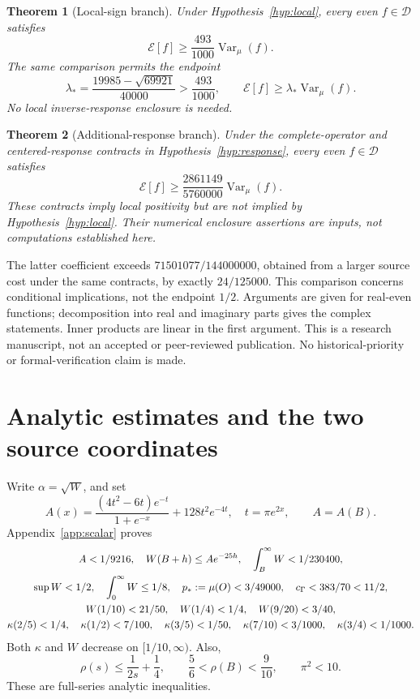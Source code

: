 \documentclass[11pt,a4paper]{article}
\numberwithin{equation}{section}
\newtheorem{theorem}{Theorem}[section]
\theoremstyle{remark}\newtheorem{remark}[theorem]{Remark}
\newcommand{\E}{\mathcal E}\newcommand{\D}{\mathcal D}
\newcommand{\Var}{\operatorname{Var}}\newcommand{\supp}{\operatorname{supp}}
\begin{document}
\begin{theorem}[Local-sign branch]\label{thm:localglobal}
Under Hypothesis~\ref{hyp:local}, every even $f\in\D$ satisfies
\begin{equation}\label{eq:493}
 \E[f]\ge\frac{493}{1000}\Var_\mu(f).
\end{equation}
The same comparison permits the endpoint
\begin{equation}\label{eq:lambdaendpoint}
 \lambda_*=\frac{19985-\sqrt{69921}}{40000}>\frac{493}{1000},
 \qquad \E[f]\ge\lambda_*\Var_\mu(f).
\end{equation}
No local inverse-response enclosure is needed.
\end{theorem}

\begin{theorem}[Additional-response branch]\label{thm:conditionalglobal}
Under the complete-operator and centered-response contracts in Hypothesis~\ref{hyp:response}, every even $f\in\D$ satisfies
\begin{equation}\label{eq:newglobal}
 \E[f]\ge\frac{2861149}{5760000}\Var_\mu(f).
\end{equation}
These contracts imply local positivity but are not implied by Hypothesis~\ref{hyp:local}. Their numerical enclosure assertions are inputs, not computations established here.
\end{theorem}
The latter coefficient exceeds $71501077/144000000$, obtained from a larger source cost under the same contracts, by exactly $24/125000$. This comparison concerns conditional implications, not the endpoint $1/2$. Arguments are given for real-even functions; decomposition into real and imaginary parts gives the complex statements. Inner products are linear in the first argument. This is a research manuscript, not an accepted or peer-reviewed publication. No historical-priority or formal-verification claim is made.

\section{Analytic estimates and the two source coordinates}\label{sec:estimates}
Write $\alpha=\sqrt W$, and set
\[
 A(x)=\frac{(4t^2-6t)e^{-t}}{1+e^{-x}}+128t^2e^{-4t},
 \quad t=\pi e^{2x},\qquad A=A(B).
\]
Appendix~\ref{app:scalar} proves
\begin{gather}
 A<1/9216,\quad W(B+h)\le Ae^{-25h},\quad
 \int_B^\infty W<1/230400,\label{eq:envelope}\\
 \sup W<1/2,\quad \int_0^\infty W\le1/8,\quad
 p_*:=\mu(O)<3/49000,\quad c_\Gamma<383/70<11/2,\label{eq:basiccaps}\\
 W(1/10)<21/50,\quad W(1/4)<1/4,\quad W(9/20)<3/40,\label{eq:pointW}\\
 \kappa(2/5)<1/4,\quad \kappa(1/2)<7/100,\quad
 \kappa(3/5)<1/50,\quad \kappa(7/10)<3/1000,\quad
 \kappa(3/4)<1/1000.\label{eq:pointkappa}
\end{gather}
Both $\kappa$ and $W$ decrease on $[1/10,\infty)$. Also,
\begin{equation}\label{eq:rhoelementary}
 \rho(s)\le\frac1{2s}+\frac14,\qquad
 \frac56<\rho(B)<\frac9{10},\qquad \pi^2<10.
\end{equation}
These are full-series analytic inequalities.
\end{document}

